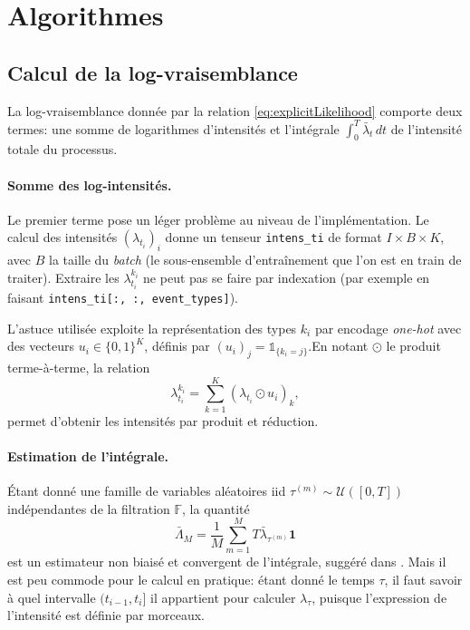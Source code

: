 \documentclass[../main.tex]{subfiles}
\begin{document}
\section{Algorithmes}\label{sec:algoAppendix}

\subsection{Calcul de la log-vraisemblance}\label{ssec:likelihoodComputation}

La log-vraisemblance donnée par la relation \eqref{eq:explicitLikelihood} comporte deux termes: une somme de logarithmes d'intensités et l'intégrale $\int_0^T \bar\lambda_t \,dt$ de l'intensité totale du processus.

\paragraph{Somme des log-intensités.} Le premier terme pose un léger problème au niveau de l'implémentation. Le calcul des intensités ${(\lambda_{t_i})}_i$ donne un tenseur \verb|intens_ti| de format $I\times B\times K$, avec $B$ la taille du \textit{batch} (le sous-ensemble d'entraînement que l'on est en train de traiter). Extraire les $\lambda^{k_i}_{t_i}$ ne peut pas se faire par indexation (par exemple en faisant \verb|intens_ti[:, :, event_types]|).

L'astuce utilisée exploite la représentation des types $k_i$ par encodage \textit{one-hot} avec des vecteurs $u_i\in{\{0,1\}}^K$, définis par $(u_i)_j = \mathds{1}_{\{k_i = j\}}$.\footnotemark En notant $\odot$ le produit terme-à-terme, la relation
\[
\lambda^{k_i}_{t_i} = \sum_{k=1}^K {(\lambda_{t_i} \odot u_i)}_k,
\]
permet d'obtenir les intensités par produit et réduction.


\paragraph{Estimation de l'intégrale.} Étant donné une famille de variables aléatoires iid $\tau^{(m)}\sim\mathcal{U}([0,T])$ indépendantes de la filtration $\mathds{F}$, la quantité 
\[
\bar{\Lambda}_M = \frac{1}{M}\sum_{m=1}^{M}T \bar\lambda_{\tau^{(m)}} \mathbf 1
\]
est un estimateur non biaisé et convergent de l'intégrale, suggéré dans \cite[16]{meiEisnerNeuralHawkes}. Mais il est peu commode pour le calcul en pratique: étant donné le temps $\tau$, il faut savoir à quel intervalle $(t_{i-1}, t_i]$ il appartient pour calculer $\lambda_\tau$, puisque l'expression de l'intensité est définie par morceaux.
\end{document}
